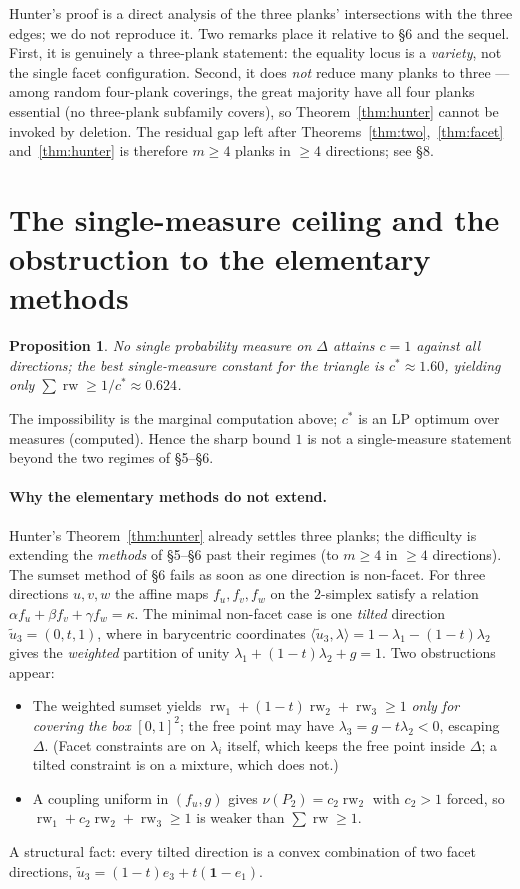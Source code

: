 \documentclass[11pt]{article}
\theoremstyle{plain}
\newtheorem{proposition}[theorem]{Proposition}
\theoremstyle{remark}
\newcommand{\rw}{\operatorname{rw}}
\begin{document}
Hunter's proof is a direct analysis of the three planks' intersections with the
three edges; we do not reproduce it. Two remarks place it relative to \S6 and the
sequel. First, it is genuinely a three-plank statement: the equality locus is a
\emph{variety}, not the single facet configuration. Second, it does \emph{not}
reduce many planks to three --- among random four-plank coverings, the great
majority have all four planks essential (no three-plank subfamily covers), so
Theorem~\ref{thm:hunter} cannot be invoked by deletion. The residual gap left after
Theorems~\ref{thm:two},~\ref{thm:facet} and~\ref{thm:hunter} is therefore
$m\ge4$ planks in $\ge4$ directions; see \S8.

\section{The single-measure ceiling and the obstruction to the elementary methods}

\begin{proposition}\label{prop:ceiling}
No single probability measure on $\Delta$ attains $c=1$ against all directions;
the best single-measure constant for the triangle is $c^\ast\approx1.60$,
yielding only $\sum\rw\ge1/c^\ast\approx0.624$.
\end{proposition}
The impossibility is the marginal computation above; $c^\ast$ is an LP optimum
over measures (computed). Hence the sharp bound $1$ is not a single-measure
statement beyond the two regimes of \S5--\S6.

\paragraph{Why the elementary methods do not extend.}
Hunter's Theorem~\ref{thm:hunter} already settles three planks; the difficulty is
extending the \emph{methods} of \S5--\S6 past their regimes (to $m\ge4$ in $\ge4$
directions). The sumset method of \S6 fails as soon as one direction is non-facet.
For three directions $u,v,w$ the affine maps $f_u,f_v,f_w$ on the $2$-simplex
satisfy a relation $\alpha f_u+\beta f_v+\gamma f_w=\kappa$. The minimal
non-facet case is one \emph{tilted} direction $\tilde u_3=(0,t,1)$, where in
barycentric coordinates $\langle\tilde u_3,\lambda\rangle=
1-\lambda_1-(1-t)\lambda_2$ gives the \emph{weighted} partition of unity
$\lambda_1+(1-t)\lambda_2+g=1$. Two obstructions appear:
\begin{itemize}
\item[(S)] The weighted sumset yields $\rw_1+(1-t)\rw_2+\rw_3\ge1$ \emph{only for
covering the box} $[0,1]^2$; the free point may have $\lambda_3=g-t\lambda_2<0$,
escaping $\Delta$. (Facet constraints are on $\lambda_i$ itself, which keeps the
free point inside $\Delta$; a tilted constraint is on a mixture, which does not.)
\item[(C)] A coupling uniform in $(f_u,g)$ gives $\nu(P_2)=c_2\rw_2$ with $c_2>1$
forced, so $\rw_1+c_2\rw_2+\rw_3\ge1$ is weaker than $\sum\rw\ge1$.
\end{itemize}
A structural fact: every tilted direction is a convex combination of two facet
directions, $\tilde u_3=(1-t)e_3+t(\mathbf 1-e_1)$.
\end{document}
